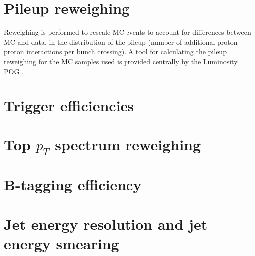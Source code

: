\section{Pileup reweighing}
Reweighing is performed to rescale MC events to account for differences between MC and data, in the distribution of the pileup (number of additional proton-proton interactions per bunch crossing). A tool for calculating the pileup reweighing for the MC samples used is provided centrally by the Luminosity POG \cite{twiki_LUMI_POG_recommendation}.

\section{Trigger efficiencies}

\section{Top $p_{T}$ spectrum reweighing}


\section{B-tagging efficiency}

\section{Jet energy resolution and jet energy smearing}